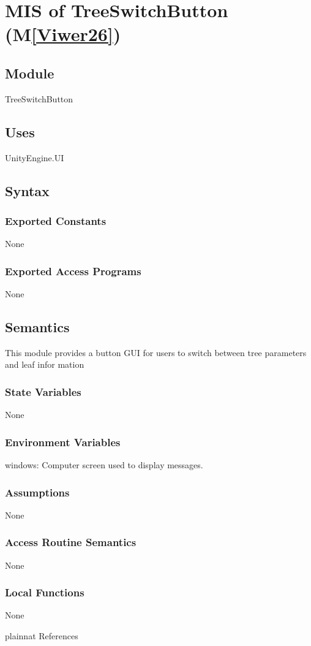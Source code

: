 \documentclass[12pt, titlepage]{article}
\newcommand{\mref}[1]{M\ref{#1}}
\begin{document}
\newpage

\section{MIS of TreeSwitchButton (\mref{Viwer26})} 

\subsection{Module}
TreeSwitchButton
\subsection{Uses}
UnityEngine.UI

\subsection{Syntax}

\subsubsection{Exported Constants}
None
\subsubsection{Exported Access Programs}
None

\subsection{Semantics}
This module provides a button GUI for users to switch between tree parameters and leaf infor
mation

\subsubsection{State Variables}
None

\subsubsection{Environment Variables}

windows: Computer screen used to display messages.

\subsubsection{Assumptions}

None

\subsubsection{Access Routine Semantics}
None

\subsubsection{Local Functions}
None

\newpage

 {plainnat}
 {References}
\end{document}
